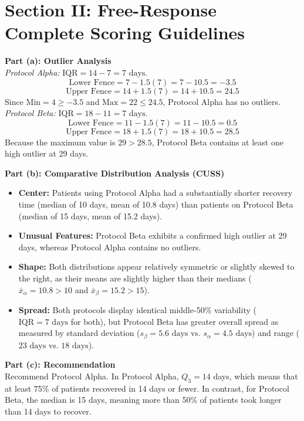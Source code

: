 \section{Section II: Free-Response Complete Scoring Guidelines}

\begin{frqrubricbox}
\textbf{Part (a): Outlier Analysis}\\
\textit{Protocol Alpha:} $\text{IQR} = 14 - 7 = 7\text{ days}$.
\[ \text{Lower Fence} = 7 - 1.5(7) = 7 - 10.5 = -3.5 \]
\[ \text{Upper Fence} = 14 + 1.5(7) = 14 + 10.5 = 24.5 \]
Since $\text{Min} = 4 \ge -3.5$ and $\text{Max} = 22 \le 24.5$, Protocol Alpha has no outliers.\\
\textit{Protocol Beta:} $\text{IQR} = 18 - 11 = 7\text{ days}$.
\[ \text{Lower Fence} = 11 - 1.5(7) = 11 - 10.5 = 0.5 \]
\[ \text{Upper Fence} = 18 + 1.5(7) = 18 + 10.5 = 28.5 \]
Because the maximum value is $29 > 28.5$, Protocol Beta contains at least one high outlier at 29 days.

\textbf{Part (b): Comparative Distribution Analysis (CUSS)}\\
\begin{itemize}
  \item \textbf{Center:} Patients using Protocol Alpha had a substantially shorter recovery time (median of 10 days, mean of 10.8 days) than patients on Protocol Beta (median of 15 days, mean of 15.2 days).
  \item \textbf{Unusual Features:} Protocol Beta exhibits a confirmed high outlier at 29 days, whereas Protocol Alpha contains no outliers.
  \item \textbf{Shape:} Both distributions appear relatively symmetric or slightly skewed to the right, as their means are slightly higher than their medians ($\bar{x}_\alpha = 10.8 > 10$ and $\bar{x}_\beta = 15.2 > 15$).
  \item \textbf{Spread:} Both protocols display identical middle-50\% variability ($\text{IQR} = 7\text{ days}$ for both), but Protocol Beta has greater overall spread as measured by standard deviation ($s_\beta = 5.6\text{ days}$ vs. $s_\alpha = 4.5\text{ days}$) and range ($23\text{ days}$ vs. $18\text{ days}$).
\end{itemize}

\textbf{Part (c): Recommendation}\\
Recommend Protocol Alpha. In Protocol Alpha, $Q_3 = 14$ days, which means that at least 75\% of patients recovered in 14 days or fewer. In contrast, for Protocol Beta, the median is 15 days, meaning more than 50\% of patients took longer than 14 days to recover.


\end{frqrubricbox}
